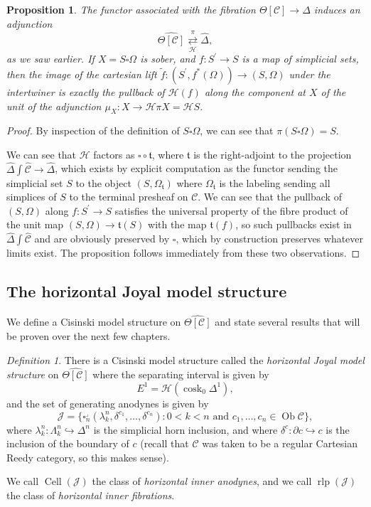 \documentclass[leqno]{article}
\numberwithin{equation}{subsection}
\theoremstyle{plain}   %
\newtheorem{prop}[equation]{Proposition}
\theoremstyle{remark}
\newtheorem{defn}[equation]{Definition}
\theoremstyle{plain}
\DeclareMathOperator{\Ob}{Ob}
\newcommand{\psh}[1]{\ensuremath{\widehat{#1}}}
\renewcommand{\C}{\ensuremath{\mathcal{C}}}
\newcommand{\cellset}{\ensuremath{\widehat{\Theta[\mathcal{C}]}}}
\newcommand{\ssetlab}{\ensuremath{\widehat{\Delta} \int \widehat{\mathcal{C}}}}
\begin{document}
\begin{prop}\label{pullbacksober}
	The functor associated with the fibration \(\Theta[\C]\to \Delta\) induces an adjunction 
	\[\cellset \underset{\mathscr{H}}{\overset{\pi}{\rightleftarrows}} \psh{\Delta} ,\]
	as we saw earlier. If \(X=S\square\Omega\) is sober, and \(f:S^\prime\to S\) is a map of simplicial sets, then the image of the cartesian lift \(\tilde{f}:(S^\prime, f^\ast(\Omega))\to (S,\Omega)\) under the intertwiner is exactly the pullback of \(\mathscr{H}(f)\) along the component at \(X\) of the unit of the adjunction \(\mu_X:X\to \mathscr{H}\pi X= \mathscr{H} S\).
\end{prop}
\begin{proof} 
	By inspection of the definition of \(S\square\Omega\), we can see that \(\pi(S\square\Omega)=S\).

	We can see that \(\mathscr{H}\) factors as \(\square\circ \mathfrak{t}\), where \(\mathfrak{t}\) is the right-adjoint to the projection \(\ssetlab\to \psh{\Delta}\), which exists by explicit computation as the functor sending the simplicial set \(S\) to the object \((S,\Omega_{\mathfrak{t}})\) where \(\Omega_{\mathfrak{t}}\) is the labeling sending all simplices of \(S\) to the terminal presheaf on \(\C\).   We can see that the pullback of \((S,\Omega)\) along \(f:S^\prime\to S\) satisfies the universal property of the fibre product of the unit map \((S,\Omega)\to \mathfrak{t}(S)\) with the map \(\mathfrak{t}(f)\), so such pullbacks exist in \(\ssetlab\) and are obviously preserved by \(\square\), which by construction preserves whatever limits exist. The proposition follows immediately from these two observations.
\end{proof}


\subsection{The horizontal Joyal model structure}
We define a Cisinski model structure on \(\cellset\) and state several results that will be proven over the next few chapters.

\begin{defn}
	There is a Cisinski model structure called the \emph{horizontal Joyal model structure} on \(\cellset\) where the separating interval is given by 
	\[E^1=\mathscr{H}(\operatorname{cosk}_0 \Delta^1),\]
	and the set of generating anodynes is given by
	\[\mathscr{J}=\{\square_n^\lrcorner(\lambda^n_k,\delta^{c_1},\dots,\delta^{c_n}) : 0<k<n \text{ and } c_1,\dots,c_n \in \Ob \C\},\]
	where \(\lambda^n_k:\Lambda^n_k\hookrightarrow \Delta^n\) is the simplicial horn inclusion, and where \(\delta^c:\partial c \hookrightarrow c\) is the inclusion of the boundary of \(c\) (recall that \(\C\) was taken to be a regular Cartesian Reedy category, so this makes sense).

	We call \(\operatorname{Cell}(\mathscr{J})\) the class of \emph{horizontal inner anodynes}, and we call \(\operatorname{rlp}(\mathscr{J})\) the class of \emph{horizontal inner fibrations}.
\end{defn}
\end{document}
